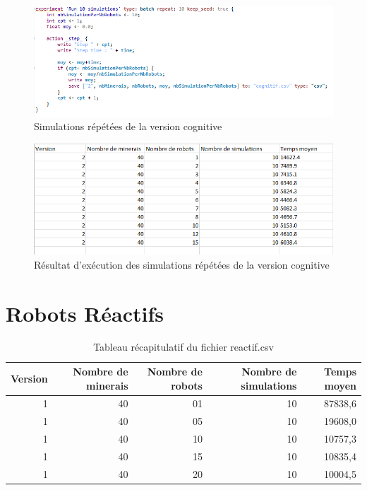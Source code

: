 \begin{figure}[!h]
	\begin{center}
		\includegraphics{code/simulations_repetees_cognitif}
	\end{center}
	\caption{Simulations répétées de la version cognitive}
\end{figure}

\begin{figure}[!h]
	\begin{center}
		\includegraphics{code/excel_cognitif}
	\end{center}
	\caption{Résultat d'exécution des simulations répétées de la version cognitive}
\end{figure}

\newpage


\section{Robots Réactifs}

\begin{table}[!h]
	\begin{center}
		\begin{tabular}{|r|r|r|r|r|}
			\hline
			Version & Nombre de minerais & Nombre de robots & Nombre de simulations & Temps moyen
			 \\
			\hline
			1 &	40 & 01 & 10 & 87838,6\\
			1 &	40 & 05 & 10 & 19608,0\\
			1 & 40 & 10 & 10 & 10757,3\\
			1 &	40 & 15	& 10 & 10835,4\\
			1 &	40 & 20	& 10 & 10004,5\\
			\hline
		\end{tabular}
	\end{center}
	\caption{Tableau récapitulatif du fichier reactif.csv}
\end{table}
~\\

